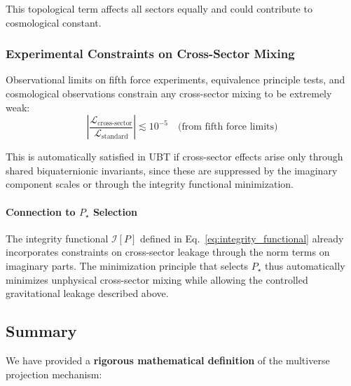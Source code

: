 This topological term affects all sectors equally and could contribute to cosmological constant.

\subsubsection{Experimental Constraints on Cross-Sector Mixing}

Observational limits on fifth force experiments, equivalence principle tests, and cosmological observations constrain any cross-sector mixing to be extremely weak:
\begin{equation}
\left| \frac{\mathcal{L}_{\text{cross-sector}}}{\mathcal{L}_{\text{standard}}} \right| \lesssim 10^{-5} \quad \text{(from fifth force limits)}
\end{equation}

This is automatically satisfied in UBT if cross-sector effects arise only through shared biquaternionic invariants, since these are suppressed by the imaginary component scales or through the integrity functional minimization.

\paragraph{Connection to $P_\star$ Selection}

The integrity functional $\mathcal{I}[P]$ defined in Eq.~\eqref{eq:integrity_functional} already incorporates constraints on cross-sector leakage through the norm terms on imaginary parts. The minimization principle that selects $P_\star$ thus automatically minimizes unphysical cross-sector mixing while allowing the controlled gravitational leakage described above.

\subsection{Summary}

We have provided a \textbf{rigorous mathematical definition} of the multiverse projection mechanism:

